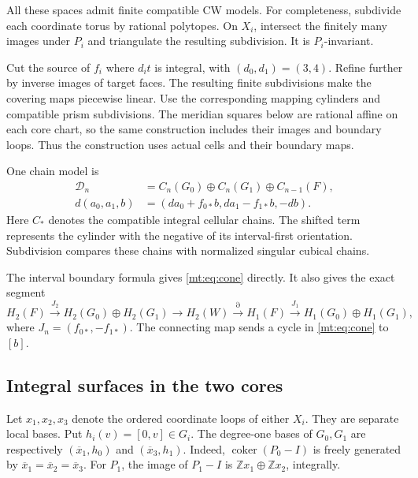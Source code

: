 All these spaces admit finite compatible CW models.
For completeness, subdivide each coordinate torus by rational polytopes.
On $X_i$, intersect the finitely many images under $P_i$ and triangulate
the resulting subdivision. It is $P_i$-invariant.

Cut the source of $f_i$ where $d_it$ is integral, with $(d_0,d_1)=(3,4)$.
Refine further by inverse images of target faces.
The resulting finite subdivisions make the covering maps piecewise linear.
Use the corresponding mapping cylinders and compatible prism subdivisions.
The meridian squares below are rational affine on each core chart,
so the same construction includes their images and boundary loops.
Thus the construction uses actual cells and their boundary maps.

One chain model is
\begin{equation}\label{mt:eq:cone}
\begin{aligned}
\mathcal D_n&=C_n(G_0)\oplus C_n(G_1)\oplus C_{n-1}(F),\\
d(a_0,a_1,b)&=(da_0+f_{0*}b,da_1-f_{1*}b,-db).
\end{aligned}
\end{equation}
Here $C_*$ denotes the compatible integral cellular chains.
The shifted term represents the cylinder with the negative of its
interval-first orientation.
Subdivision compares these chains with normalized singular cubical chains.

The interval boundary formula gives \eqref{mt:eq:cone} directly.
It also gives the exact segment
\begin{equation}\label{mt:eq:MV}
H_2(F)\xrightarrow{J_2}H_2(G_0)\oplus H_2(G_1)
\longrightarrow H_2(W)\xrightarrow{\partial}H_1(F)
\xrightarrow{J_1}H_1(G_0)\oplus H_1(G_1),
\end{equation}
where $J_n=(f_{0*},-f_{1*})$.
The connecting map sends a cycle in \eqref{mt:eq:cone} to $[b]$.

\subsection{Integral surfaces in the two cores}

Let $x_1,x_2,x_3$ denote the ordered coordinate loops of either $X_i$.
They are separate local bases. Put $h_i(v)=[0,v]\in G_i$.
The degree-one bases of $G_0,G_1$ are respectively
$(\overline x_1,h_0)$ and $(\overline x_3,h_1)$.
Indeed, $\operatorname{coker}(P_0-I)$ is freely generated by
$\overline x_1=\overline x_2=\overline x_3$.
For $P_1$, the image of $P_1-I$ is
$\mathbb Zx_1\oplus\mathbb Zx_2$, integrally.

